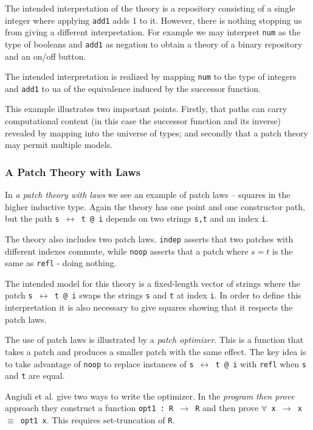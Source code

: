 The intended interpretation of the theory is a repository consisting of a single
integer where applying \texttt{add1} adds 1 to it. However, there is nothing
stopping us from giving a different interpretation. For example we may interpret
\texttt{num} as the type of booleans and \texttt{add1} as negation to obtain a
theory of a binary repository and an on/off button.

The intended interpretation is realized by mapping \texttt{num} to the type of
integers and \texttt{add1} to ua of the equivalence induced by the successor function.

This example illustrates two important points. Firstly, that paths can carry
computational content (in this case the successor function and its inverse)
revealed by mapping into the universe of types; and secondly that a
patch theory may permit multiple models.

\subsubsection{A Patch Theory with Laws}

In \emph{a patch theory with laws} we see an example of patch laws -- squares
in the higher inductive type. Again the theory has one point and one constructor
path, but the path \texttt{s~$\leftrightarrow$~t~@~i} depends on two
strings \texttt{s,t} and an index \texttt{i}.

The theory also includes two patch laws. \texttt{indep} asserts that two patches
with different indexes commute, while \texttt{noop} asserts that a patch where
$s = t$ is the same as \texttt{refl} - doing nothing.

The intended model for this theory is a fixed-length vector of strings where the
patch \texttt{s~$\leftrightarrow$~t~@~i} swaps the strings \texttt{s} and
\texttt{t} at index \texttt{i}. In order to define this interpretation it is
also necessary to give squares showing that it respects the patch laws.

The use of patch laws is illustrated by a \emph{patch optimizer}. This is a
function that takes a patch and produces a smaller patch with the same effect.
The key idea is to take advantage of \texttt{noop} to replace instances of
\texttt{s~$\leftrightarrow$~t~@~i} with \texttt{refl} when \texttt{s} and
\texttt{t} are equal.

Angiuli et al. give two ways to write the optimizer. In the \emph{program then
  prove} approach they construct a function \texttt{opt1 : R $\rightarrow$ R}
and then prove \texttt{$\forall$ x $\rightarrow$ x $\equiv$ opt1 x}. This
requires set-truncation of \texttt{R}.

